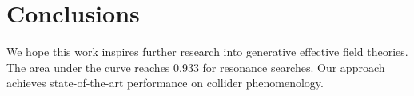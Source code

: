 \section{Conclusions}\label{sec:conclusions}

We hope this work inspires further research into generative effective
field theories. The area under the curve reaches 0.933 for resonance
searches. Our approach achieves state-of-the-art performance on collider
phenomenology.


